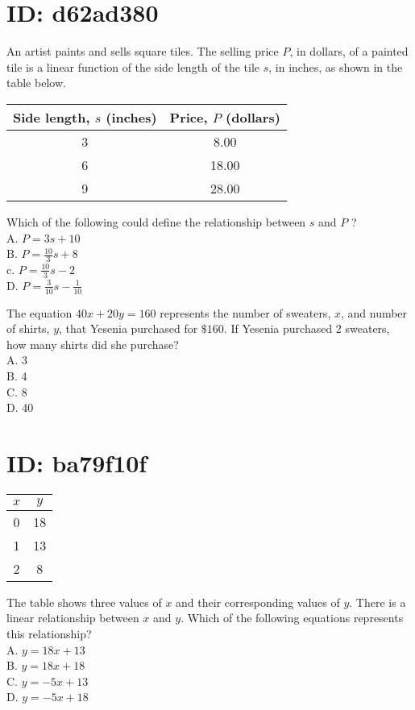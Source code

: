 \section*{ID: d62ad380}
An artist paints and sells square tiles. The selling price $P$, in dollars, of a painted tile is a linear function of the side length of the tile $s$, in inches, as shown in the table below.

\begin{center}
\begin{tabular}{|c|c|}
\hline
Side length, $s$ (inches) & Price, $P$ (dollars) \\
\hline
3 & 8.00 \\
\hline
6 & 18.00 \\
\hline
9 & 28.00 \\
\hline
\end{tabular}
\end{center}

Which of the following could define the relationship between $s$ and $P$ ?\\
A. $P=3 s+10$\\
B. $P=\frac{10}{3} s+8$\\
c. $P=\frac{10}{3} s-2$\\
D. $P=\frac{3}{10} s-\frac{1}{10}$

The equation $40 x+20 y=160$ represents the number of sweaters, $x$, and number of shirts, $y$, that Yesenia purchased for $\$ 160$. If Yesenia purchased 2 sweaters, how many shirts did she purchase?\\
A. 3\\
B. 4\\
C. 8\\
D. 40

\section*{ID: ba79f10f}
\begin{center}
\begin{tabular}{|c|c|}
\hline
$x$ & $y$ \\
\hline
0 & 18 \\
\hline
1 & 13 \\
\hline
2 & 8 \\
\hline
\end{tabular}
\end{center}

The table shows three values of $x$ and their corresponding values of $y$. There is a linear relationship between $x$ and $y$. Which of the following equations represents this relationship?\\
A. $y=18 x+13$\\
B. $y=18 x+18$\\
C. $y=-5 x+13$\\
D. $y=-5 x+18$

